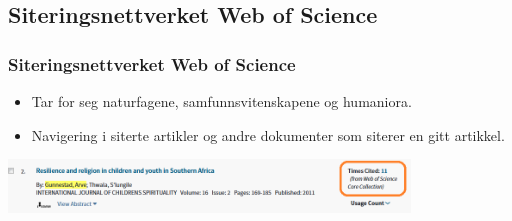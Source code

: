 \subsection{Siteringsnettverket Web of Science}
\begin{frame}
  \frametitle{Siteringsnettverket Web of Science}
  \begin{itemize}
    \item Tar for seg naturfagene, samfunnsvitenskapene og humaniora.
    \item Navigering i siterte artikler og andre dokumenter som siterer en gitt artikkel.
  \end{itemize}
\end{frame}

\begin{frame}
  \centering
  \includegraphics[width=0.8\textwidth]{../media/web-of-science-citations-2.png}
\end{frame}
